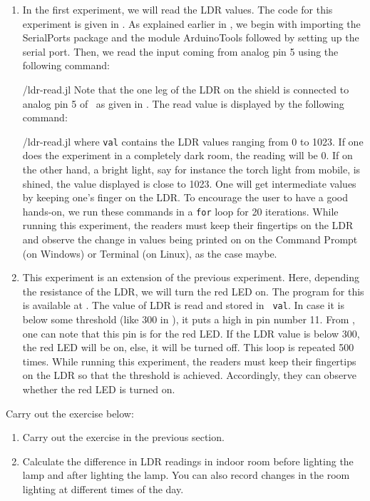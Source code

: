 \begin{enumerate}
\item In the first experiment, we will read the LDR values. The code for this experiment is given in
. As explained earlier in , we begin with importing the SerialPorts 
\cite{julia-serial-ports} package and the module ArduinoTools followed by setting up the serial port.
Then, we read the input coming from analog pin 5 using the 
following command:

{\LocLDRjuliacode/ldr-read.jl} Note that the one leg of the LDR on
the shield is connected to analog pin 5 of \arduino\, 
as given in . The read value is displayed 
 by the following command: 

{\LocLDRjuliacode/ldr-read.jl} where {\tt val} contains
the LDR values ranging from 0 to 1023. If one does the experiment in a completely dark room, the
reading will be 0. If on the other hand, a bright light, say for instance the torch
light from mobile, is shined, the value displayed is close to 1023. One will get
intermediate values by keeping one's finger on the LDR. To
encourage the user to have a good hands-on, we run these commands in
a {\tt for} loop for 20 iterations. While running this experiment, the readers must keep their fingertips on the LDR and
observe the change in values being printed on on the
Command Prompt (on Windows) or Terminal (on Linux), as the case maybe.


\item This experiment is an extension of the previous experiment. Here, depending the resistance of the LDR, we will
  turn the red LED on.  The program for this is available at
  .  The value of LDR is read and stored in {\tt
    val}.  In case it is below some threshold (like 300 in ), 
    it puts a high in pin number 11. From , 
    one can note that this pin is for the red LED.  If the LDR value is below 300, 
    the red LED will be on, else, it will be turned off.  
    This loop is repeated 500 times. While running this experiment, the readers 
    must keep their fingertips on the LDR so that the threshold is achieved. Accordingly, 
    they can observe whether the red LED is turned on. 
\end{enumerate}

\begin{exercise}
Carry out the exercise below:
\begin{enumerate}
\item Carry out the exercise in the previous section. 
\item Calculate the difference in LDR readings in indoor room
  before lighting the lamp and after lighting the lamp. You can also
  record changes in the room lighting at different times of the day.
\end{enumerate}
\end{exercise}

